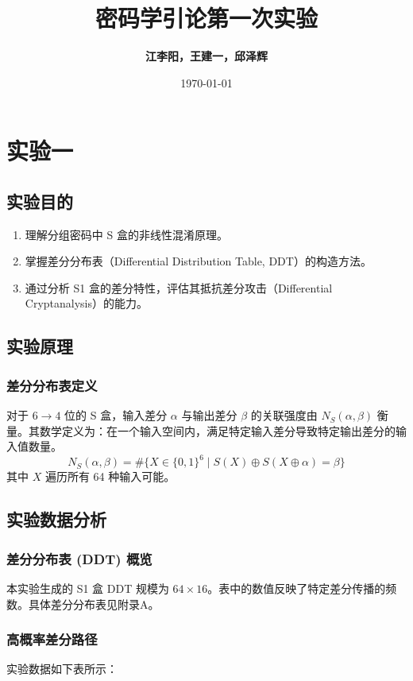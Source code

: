 \documentclass[12pt,a4paper]{article}
\title{
\textbf{\LARGE{密码学引论第一次实验}}\\[0.5em]
}
\author{\textbf{江李阳，王建一，邱泽辉}}
\date{\today}
\begin{document}
\maketitle
\thispagestyle{fancy} %
\section{实验一}
\subsection{实验目的}
\begin{enumerate}
    \item 理解分组密码中 S 盒的非线性混淆原理。
    \item 掌握差分分布表（Differential Distribution Table, DDT）的构造方法。
    \item 通过分析 S1 盒的差分特性，评估其抵抗差分攻击（Differential Cryptanalysis）的能力。
\end{enumerate}

\subsection{实验原理}
\subsubsection{差分分布表定义}
对于 $6 \to 4$ 位的 S 盒，输入差分 $\alpha$ 与输出差分 $\beta$ 的关联强度由 $N_S(\alpha, \beta)$ 衡量。其数学定义为：在一个输入空间内，满足特定输入差分导致特定输出差分的输入值数量。
$$ N_S(\alpha, \beta) = \# \{ X \in \{0,1\}^6 \mid S(X) \oplus S(X \oplus \alpha) = \beta \} $$
其中 $X$ 遍历所有 64 种输入可能。

\subsection{实验数据分析}

\subsubsection{差分分布表 (DDT) 概览}
本实验生成的 S1 盒 DDT 规模为 $64 \times 16$。表中的数值反映了特定差分传播的频数。具体差分分布表见附录A。
\subsubsection{高概率差分路径}
实验数据如下表所示：
\end{document}
